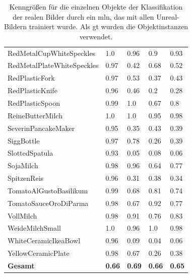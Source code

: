 \begin{table}
\begin{tabularx}{\textwidth}{Xllll}
RedMetalCupWhiteSpeckles & 1.0 & 0.96 & 0.9 & 0.93 \\  
RedMetalPlateWhiteSpeckles & 0.97 & 0.42 & 0.68 & 0.52 \\  
RedPlasticFork & 0.97 & 0.53 & 0.37 & 0.43 \\  
RedPlasticKnife & 0.96 & 0.46 & 0.2 & 0.28 \\  
RedPlasticSpoon & 0.99 & 1.0 & 0.67 & 0.8 \\  
ReineButterMilch & 1.0 & 1.0 & 0.95 & 0.98 \\  
SeverinPancakeMaker & 0.95 & 0.35 & 0.43 & 0.39 \\  
SiggBottle & 0.97 & 0.78 & 0.26 & 0.39 \\  
SlottedSpatula & 0.93 & 0.05 & 0.08 & 0.06 \\  
SojaMilch & 0.98 & 0.96 & 0.64 & 0.77 \\  
SpitzenReis & 0.96 & 0.31 & 0.38 & 0.34 \\  
TomatoAlGustoBasilikum & 0.99 & 0.68 & 0.81 & 0.74 \\  
TomatoSauceOroDiParma & 0.98 & 0.67 & 0.92 & 0.77 \\  
VollMilch & 0.98 & 0.91 & 0.76 & 0.83 \\  
WeideMilchSmall & 1.0 & 0.96 & 1.0 & 0.98 \\  
WhiteCeramicIkeaBowl & 0.96 & 0.09 & 0.04 & 0.06 \\  
YellowCeramicPlate & 0.98 & 0.67 & 0.26 & 0.38 \\     \hline
\textbf{Gesamt}		&	\textbf{0.66}   &	\textbf{0.69}  & \textbf{0.66}     &  \textbf{0.65}    \\
\end{tabularx}
\caption[Objektinstanzen-spezifische Kenngrößen der Klassifikation mit Unreal-Trainingsset und realem Testset]{Kenngrößen für die einzelnen Objekte der Klassifikation der realen Bilder durch ein \gls{mln}, das mit allen Unreal-Bildern trainiert wurde. Als \gls{gt} wurden die Objektinstanzen verwendet.}
\label{tab:UnrealRealGTInstance_metrics}
\end{table} 


